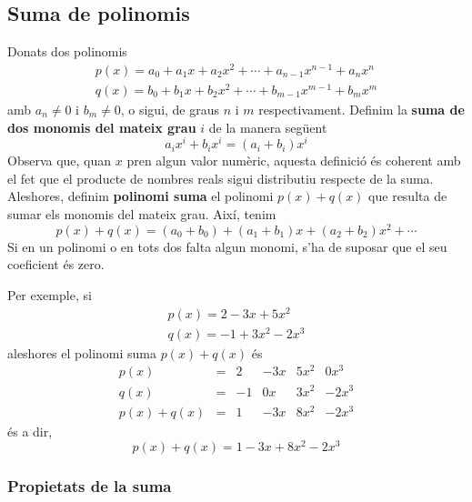 \subsection{Suma de polinomis}

Donats dos polinomis\begin{equation*}
\begin{array}{l}
p(x)=a_{0}+a_{1}x+a_{2}x^{2}+\cdots +a_{n-1}x^{n-1}+a_{n}x^{n} \\
q(x)=b_{0}+b_{1}x+b_{2}x^{2}+\cdots +b_{m-1}x^{m-1}+b_{m}x^{m}\end{array}\end{equation*}amb $a_{n}\neq 0$ i $b_{m}\neq 0$, o sigui, de graus $n$ i $m$
respectivament. Definim la \textbf{suma de dos monomis del mateix grau} $i$ de la manera següent\begin{equation*}
a_{i}x^{i}+b_{i}x^{i}=(a_{i}+b_{i})x^{i}
\end{equation*}
Observa que, quan $x$ pren algun valor numèric, aquesta definició és coherent amb el fet que el producte de nombres reals
sigui distributiu respecte de la suma. Aleshores, definim \textbf{polinomi
suma} el polinomi $p(x)+q(x)$ que resulta de sumar els monomis del mateix
grau. Així, tenim\begin{equation*}
p(x)+q(x)=(a_{0}+b_{0})+(a_{1}+b_{1})x+(a_{2}+b_{2})x^{2}+\cdots
\end{equation*}Si en un polinomi o en tots dos falta algun monomi, s'ha de suposar que
el seu coeficient és zero.

Per exemple, si\begin{equation*}
\begin{array}{l}
p(x)=2-3x+5x^{2} \\
q(x)=-1+3x^{2}-2x^{3}\end{array}\end{equation*}aleshores el polinomi suma $p(x)+q(x)$ és\begin{equation*}
\begin{array}{cccccc}
p(x) & = & 2 & -3x & 5x^{2} & 0x^{3} \\
q(x) & = & -1 & 0x & 3x^{2} & -2x^{3} \\ \hline
p(x)+q(x) & = & 1 & -3x & 8x^{2} & -2x^{3}\end{array}\end{equation*}és a dir,\begin{equation*}
p(x)+q(x)=1-3x+8x^{2}-2x^{3}
\end{equation*}

\subsubsection{Propietats de la suma}

